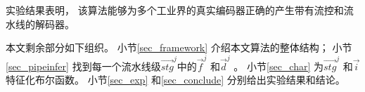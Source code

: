 实验结果表明，
该算法能够为多个工业界的真实编码器正确的产生带有流控和流水线的解码器。

本文剩余部分如下组织。
小节\ref{sec_framework} 介绍本文算法的整体结构；
小节\ref{sec_pipeinfer} 找到每一个流水线级$\vec{stg}^j$中的$\vec{f}^j$ 和$\vec{d}^j$ 。
小节\ref{sec_char} 为$\vec{stg}^j$ 和$\vec{i}$特征化布尔函数。
小节\ref{sec_exp} 和\ref{sec_conclude} 分别给出实验结果和结论。


%
%
%
%
%
%
%
%
%
%
%
%
%
%
